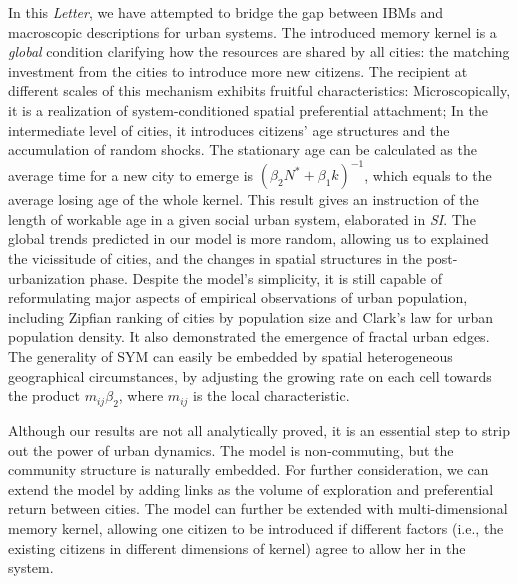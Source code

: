 \documentclass[reprint,unsortedaddress,amsmath,amssymb,aps,prl,showkeys]{revtex4-2}
\begin{document}
In this \textit{Letter}, we have attempted to bridge the gap between IBMs and macroscopic descriptions for urban systems. The introduced memory kernel is a \emph{global} condition clarifying how the resources are shared by all cities: the matching investment from the cities to introduce more new citizens. The recipient at different scales of this mechanism exhibits fruitful characteristics: Microscopically, it is a realization of system-conditioned spatial preferential attachment; In the intermediate level of cities, it introduces citizens' age structures and the accumulation of random shocks. The stationary age can be calculated as the average time for a new city to emerge is $(\beta_2 N^* + \beta_1 k)^{-1}$, which equals to the average losing age of the whole kernel. This result gives an instruction of the length of workable age in a given social urban system, elaborated in \textit{SI}. The global trends predicted in our model is more random, allowing us to explained the vicissitude of cities, and the changes in spatial structures in the post-urbanization phase. Despite the model's simplicity, it is still capable of reformulating major aspects of empirical observations of urban population, including Zipfian ranking of cities by population size and Clark's law for urban population density. It also demonstrated the emergence of fractal urban edges. The generality of SYM can easily be embedded by spatial heterogeneous geographical circumstances, by adjusting the growing rate on each cell towards the product $m_{ij}\beta_2$, where $m_{ij}$ is the local characteristic.

Although our results are not all analytically proved, it is an essential step to strip out the power of urban dynamics. The model is non-commuting, but the community structure is naturally embedded. For further consideration, we can extend the model by adding links as the volume of exploration and preferential return between cities\cite{WANG2019121921}. The model can further be extended with multi-dimensional memory kernel, allowing one citizen to be introduced if different factors\cite{tokita2020social} (i.e., the existing citizens in different dimensions of kernel) agree to allow her in the system.




% 
\end{document}
